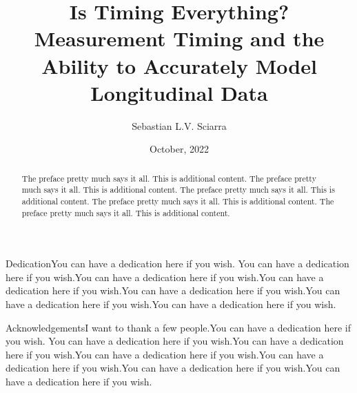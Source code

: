 \documentclass[
12pt, %
twoside,
english]{guelphthesis}
\title{Is Timing Everything? Measurement Timing and the Ability to Accurately Model Longitudinal Data}
\author{Sebastian L.V. Sciarra}
\date{October, 2022}
\let\oldfrontmatter\frontmatter
\renewcommand{\headrulewidth}{0pt}
\renewcommand{\frontmatter}{
  \oldfrontmatter
     \SetWatermarkLightness{0.8} %
  \SetWatermarkText{DRAFT}
  
  
   \pagestyle{frontmatter} %
}
\renewcommand{\headrulewidth}{0pt}
\theoremstyle{definition}
\theoremstyle{definition}
\theoremstyle{definition}
\theoremstyle{definition}
\theoremstyle{remark}
\begin{document}
\frontmatter %

  \maketitle

\setcounter{page}{2} %

\thispagestyle{empty} %
  \begin{abstract}{2}{The preface pretty much says it all. This is additional content. The preface pretty much says it all. This is additional content. The preface pretty much says it all. This is additional content. The preface pretty much says it all. This is additional content. The preface pretty much says it all. This is additional content.}  %

  \end{abstract}

  \begin{preambleItem}{2}{Dedication}{You can have a dedication here if you wish. You can have a dedication here if you wish.You can have a dedication here if you wish.You can have a dedication here if you wish.You can have a dedication here if you wish.You can have a dedication here if you wish.You can have a dedication here if you wish.}
  \end{preambleItem}
   \begin{preambleItem}{2}{Acknowledgements}{I want to thank a few people.You can have a dedication here if you wish. You can have a dedication here if you wish.You can have a dedication here if you wish.You can have a dedication here if you wish.You can have a dedication here if you wish.You can have a dedication here if you wish.You can have a dedication here if you wish.}
  \end{preambleItem}


\fancypagestyle{plain}{%
  \fancyhf{}%
  \renewcommand{\headrulewidth}{0pt}
  \fancyhead[R]{\thepage}

   }

  \hypersetup{linkcolor = black, pdfborder= 0 0 0} %
  \setcounter{secnumdepth}{5}
  \setcounter{tocdepth}{5}
  \tableofcontents
  \newpage
\end{document}
